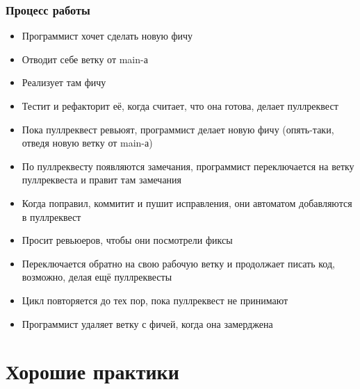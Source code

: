 \documentclass{../../slides-style}
\begin{document}
    \begin{frame}
        \frametitle{Процесс работы}
        \begin{footnotesize}
            \begin{itemize}
                \item Программист хочет сделать новую фичу
                \item Отводит себе ветку от main-а
                \item Реализует там фичу
                \item Тестит и рефакторит её, когда считает, что она готова, делает пуллреквест
                \item Пока пуллреквест ревьюят, программист делает новую фичу (опять-таки, отведя новую ветку от main-а)
                \item По пуллреквесту появляются замечания, программист переключается на ветку пуллреквеста и правит там замечания
                \item Когда поправил, коммитит и пушит исправления, они автоматом добавляются в пуллреквест
                \item Просит ревьюеров, чтобы они посмотрели фиксы
                \item Переключается обратно на свою рабочую ветку и продолжает писать код, возможно, делая ещё пуллреквесты 
                \item Цикл повторяется до тех пор, пока пуллреквест не принимают
                \item Программист удаляет ветку с фичей, когда она замерджена
            \end{itemize}
        \end{footnotesize}
    \end{frame}

    \section{Хорошие практики}
\end{document}

